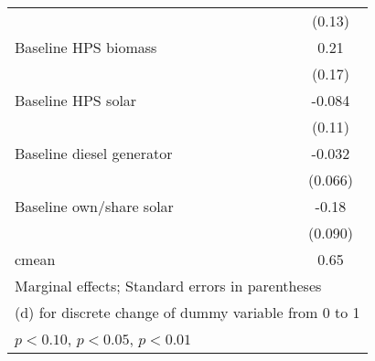 \begin{table}[htbp]
\begin{tabular*}{1\hsize}{@{\hskip\tabcolsep\extracolsep\fill}l*{5}{c}}
                &                  &                  &                  &                  &   (0.13)         \\
Baseline HPS biomass&                  &                  &                  &                  &     0.21         \\
                &                  &                  &                  &                  &   (0.17)         \\
Baseline HPS solar&                  &                  &                  &                  &   -0.084         \\
                &                  &                  &                  &                  &   (0.11)         \\
Baseline diesel generator&                  &                  &                  &                  &   -0.032         \\
                &                  &                  &                  &                  &  (0.066)         \\
Baseline own/share solar&                  &                  &                  &                  &    -0.18\sym{**} \\
                &                  &                  &                  &                  &  (0.090)         \\
\midrule
cmean           &                  &                  &                  &                  &     0.65         \\
\bottomrule
\multicolumn{6}{l}{\footnotesize Marginal effects; Standard errors in parentheses}\\
\multicolumn{6}{l}{\footnotesize  (d) for discrete change of dummy variable from 0 to 1}\\
\multicolumn{6}{l}{\footnotesize \sym{*} \(p<0.10\), \sym{**} \(p<0.05\), \sym{***} \(p<0.01\)}\\
\end{tabular*}
\end{table}
